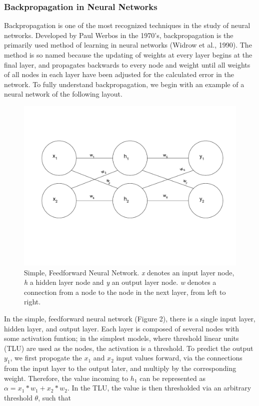 \documentclass[11pt]{article}
\begin{document}
\subsubsection{Backpropagation in Neural Networks}
Backpropagation is one of the most recognized techniques in the study of neural networks. Developed by Paul Werbos in the 1970's, backpropagation is the primarily used method of learning in neural networks (Widrow et al., 1990). The method is so named because the updating of weights at every layer begins at the final layer, and propagates backwards to every node and weight until all weights of all nodes in each layer have been adjusted for the calculated error in the network. To fully understand backpropagation, we begin with an example of a neural network of the following layout.
\begin{figure}[H]
\begin{center}
\includegraphics[scale=0.5,trim={0 3cm 0 3cm},clip]{./Figures/smallNN.pdf}
\end{center}
\caption{Simple, Feedforward Neural Network. \textit{x} denotes an input layer node, \textit{h} a hidden layer node and \textit{y} an output layer node. \textit{w} denotes a connection from a node to the node in the next layer, from left to right.}
\end{figure}

In the simple, feedforward neural network (Figure 2), there is a single input layer, hidden layer, and output layer. Each layer is composed of several nodes with some activation funtion; in the simplest models, where threshold linear units (TLU) are used as the nodes, the activation is a threshold. To predict the output $y_1$, we first propogate the $x_1$ and $x_2$ input values forward, via the connections from the input layer to the output later, and multiply by the corresponding weight. Therefore, the value incoming to $h_1$ can be represented as $\alpha = x_1*w_1 + x_2*w_2$. In the TLU, the value is then thresholded via an arbitrary threshold $\theta$, such that 
\end{document}
